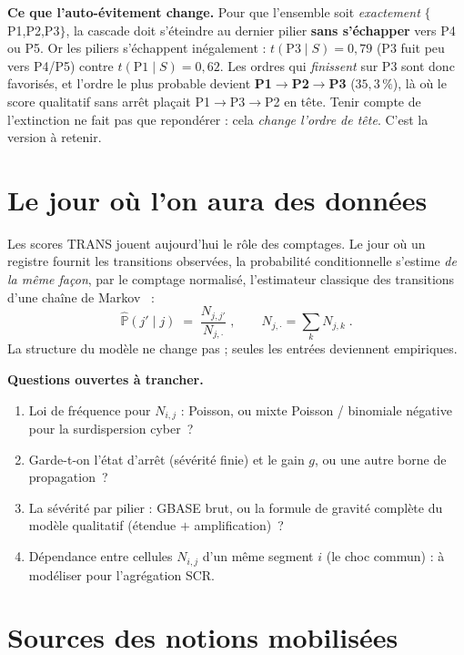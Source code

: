 \documentclass[11pt,a4paper]{article}
\begin{document}
\begin{attention}
\textbf{Ce que l'auto-évitement change.} Pour que l'ensemble soit \emph{exactement}
$\{$P1,P2,P3$\}$, la cascade doit s'éteindre au dernier pilier \textbf{sans s'échapper} vers P4
ou P5. Or les piliers s'échappent inégalement : $t(\text{P3}\mid S)=0{,}79$ (P3 fuit peu vers
P4/P5) contre $t(\text{P1}\mid S)=0{,}62$. Les ordres qui \emph{finissent} sur P3 sont donc
favorisés, et l'ordre le plus probable devient \textbf{P1$\to$P2$\to$P3} ($35{,}3\,\%$), là où le
score qualitatif sans arrêt plaçait P1$\to$P3$\to$P2 en tête. Tenir compte de l'extinction ne fait
pas que repondérer : cela \emph{change l'ordre de tête}. C'est la version à retenir.
\end{attention}

\section{Le jour où l'on aura des données}

Les scores TRANS jouent aujourd'hui le rôle des comptages. Le jour où un registre fournit les
transitions observées, la probabilité conditionnelle s'estime \emph{de la même façon}, par le
comptage normalisé, l'estimateur classique des transitions d'une chaîne de
Markov~\cite{AndersonGoodman1957} :
\[
\widehat{\mathbb P}(j' \mid j) \;=\; \frac{N_{j,j'}}{N_{j,\cdot}}\;,\qquad N_{j,\cdot} = \sum_{k} N_{j,k}\;.
\]
La structure du modèle ne change pas ; seules les entrées deviennent empiriques.

\begin{attention}
\textbf{Questions ouvertes à trancher.}
\begin{enumerate}[leftmargin=1.5em,itemsep=1pt,topsep=2pt]
\item Loi de fréquence pour $N_{i,j}$ : Poisson, ou mixte Poisson / binomiale négative pour la
  surdispersion cyber~?
\item Garde-t-on l'état d'arrêt (sévérité finie) et le gain $g$, ou une autre borne de
  propagation~?
\item La sévérité par pilier : GBASE brut, ou la formule de gravité complète du modèle
  qualitatif (étendue $+$ amplification)~?
\item Dépendance entre cellules $N_{i,j}$ d'un même segment $i$ (le choc commun) : à modéliser
  pour l'agrégation SCR.
\end{enumerate}
\end{attention}

\section{Sources des notions mobilisées}
\end{document}
